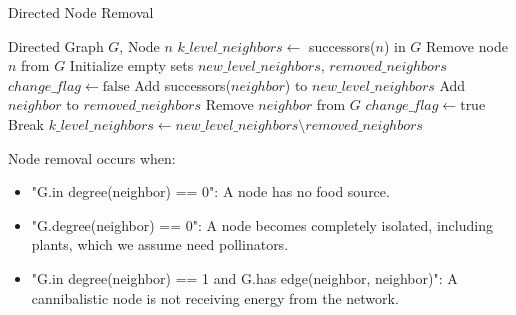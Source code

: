 \documentclass[a4paper, 12pt]{report}
\begin{document}
\begin{minipage}{\textwidth}
\begin{algorithm}[H]
    \caption{Directed Node Removal}
    \begin{algorithmic}[1]
    \small
    \Require Directed Graph $G$, Node $n$
    \State $k\_level\_neighbors \gets$ successors($n$) in $G$
    \State Remove node $n$ from $G$
        \State Initialize empty sets $new\_level\_neighbors$, $removed\_neighbors$
            \State $change\_flag \gets \text{false}$
            \State Add successors($neighbor$) to $new\_level\_neighbors$
            \State Add $neighbor$ to $removed\_neighbors$
            \State Remove $neighbor$ from $G$
            \State $change\_flag \gets \text{true}$
            \EndIf
                \State Break
            \EndIf
        \EndFor
        \State $k\_level\_neighbors \gets new\_level\_neighbors \setminus removed\_neighbors$
    \EndWhile
    \end{algorithmic}
\end{algorithm}
\end{minipage}

Node removal occurs when:
\begin{itemize}
\item "G.in degree(neighbor) == 0": A node has no food source.
\item "G.degree(neighbor) == 0": A node becomes completely isolated, including plants, which we assume need pollinators.
\item "G.in degree(neighbor) == 1 and G.has edge(neighbor, neighbor)": A cannibalistic node is not receiving energy from the network.
\end{itemize}
\end{document}

